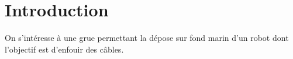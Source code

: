 \section*{Introduction}
\ifprof
\else
On s'intéresse à une grue permettant la dépose sur fond marin d'un robot dont l'objectif est d'enfouir des câbles.
\fi
%
%
%
%
%
%
%
%
%
%
%
%

